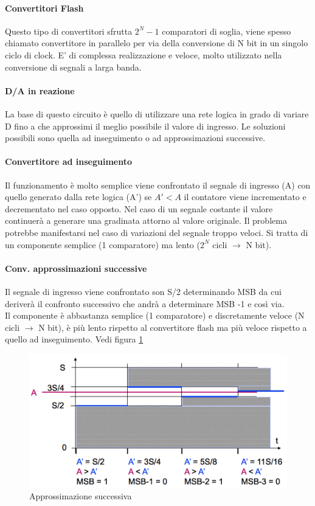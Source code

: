 \documentclass[12pt]{article}
\begin{document}
\paragraph{Convertitori Flash} Questo tipo di convertitori sfrutta $2^N-1$ comparatori di soglia, viene spesso chiamato convertitore in parallelo per via della conversione di N bit in un singolo ciclo di clock. E' di complessa realizzazione e veloce, molto utilizzato nella conversione di segnali a larga banda.
\paragraph{D/A in reazione} La base di questo circuito è quello di utilizzare una rete logica in grado di variare D fino a che approssimi il meglio possibile il valore di ingresso. Le soluzioni possibili sono quella ad inseguimento o ad approssimazioni successive.
\paragraph{Convertitore ad inseguimento} Il funzionamento è molto semplice viene confrontato il segnale di ingresso (A) con quello generato dalla rete logica (A') se $A'<A$ il contatore viene incrementato e decrementato nel caso opposto. Nel caso di un segnale costante il valore continuerà a generare una gradinata attorno al valore originale. Il problema potrebbe manifestarsi nel caso di variazioni del segnale troppo veloci. Si tratta di un componente semplice (1 comparatore) ma lento ($2^N$ cicli $\rightarrow$ N bit).
\paragraph{Conv. approssimazioni successive} Il segnale di ingresso viene confrontato son S/2 determinando MSB da cui deriverà il confronto successivo che andrà a determinare MSB -1 e così via.\\
Il componente è abbastanza semplice (1 comparatore) e discretamente veloce (N cicli $\rightarrow$ N bit), è più lento rispetto al convertitore flash ma più veloce rispetto a quello ad inseguimento. Vedi figura \ref{fig:ap_succ}

\begin{figure}[!hpt]
  \includegraphics[width=\textwidth]{images/ap_succ.png}
  \caption{Approssimazione successiva}
  \label{fig:ap_succ}
\end{figure}
\end{document}
